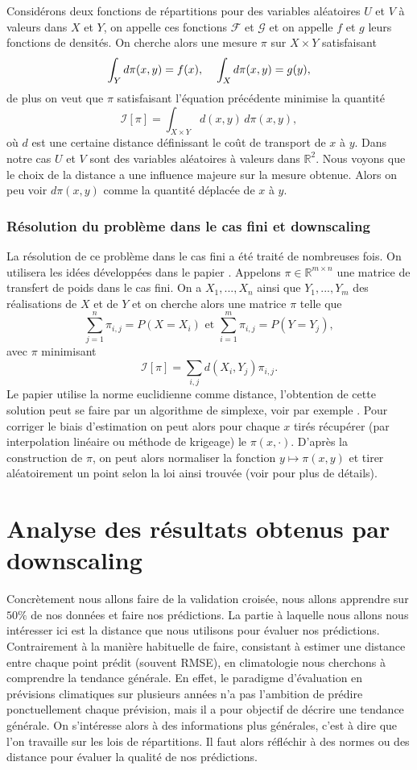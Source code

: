 \documentclass[a4paper,10pt]{article}
\begin{document}
Considérons deux fonctions de répartitions pour des variables aléatoires $U$ et $V$ à valeurs dans $X$ et $Y$, on appelle ces fonctions $\mathcal{F}$ et $\mathcal{G}$ et on appelle $f$ et $g$ leurs fonctions de densités. On cherche alors une mesure $\pi$ sur  $X \times Y$ satisfaisant
\[\int_{Y} d\pi(x,y)= f(x), \hspace{4mm} \int_{X}  d \pi(x,y)= g(y),\]
de plus on veut que $\pi$ satisfaisant l'équation précédente minimise la quantité
\[\mathcal{I}[\pi]=\int_{X \times Y}d(x,y) \, d\pi(x,y),\]
où $d$ est une certaine distance définissant le coût de transport de $x$ à $y$. Dans notre cas $U$ et $V$ sont des variables aléatoires à valeurs dans $\mathbb{R}^2$. Nous voyons que le choix de la distance a une influence majeure sur la mesure obtenue. Alors on peu voir $d\pi(x,y)$ comme la quantité déplacée de $x$ à $y$.
\subsubsection{Résolution du problème dans le cas fini et downscaling}
La résolution de ce problème dans le cas fini a été traité de nombreuses fois. On utilisera les idées développées dans le papier \cite{robin2019multivariate}. Appelons $\pi \in \mathbb{R}^{m\times n}$ une matrice de transfert de poids dans le cas fini. On a $X_1,...,X_n$ ainsi que $Y_1,...,Y_m$ des réalisations de $X$ et de $Y$ et on cherche alors une matrice $\pi$ telle que 
\[\sum_{j=1}^{n} \pi_{i,j}= P(X=X_i) \textrm{ et } \sum_{i=1}^{m} \pi_{i,j}= P(Y=Y_j),\]
avec $\pi$ minimisant 
\[\mathcal{I}[\pi]=\sum_{i,j}d(X_i,Y_j)\pi_{i,j}.\]  
Le papier utilise la norme euclidienne comme distance, l'obtention de cette solution peut se faire par un algorithme de simplexe, voir par exemple \cite{huang2012optimal}. Pour corriger le biais d'estimation on peut alors pour chaque $x$ tirés récupérer (par interpolation linéaire ou méthode de krigeage) le $\pi(x,\cdot)$. D'après la construction de $\pi$, on peut alors normaliser la fonction $y\mapsto \pi(x,y)$ et tirer aléatoirement un point selon la loi ainsi trouvée (voir \cite{robin2019multivariate} pour plus de détails).




\section{Analyse des résultats obtenus par downscaling}
\label{analyse-pred}
Concrètement nous allons faire de la validation croisée, nous allons apprendre sur $50\%$ de nos données et faire nos prédictions. La partie à laquelle nous allons nous intéresser ici est la distance que nous utilisons pour évaluer nos prédictions. Contrairement à la manière habituelle de faire, consistant à estimer une distance entre chaque point prédit (souvent RMSE), en climatologie nous cherchons à comprendre la tendance générale. En effet, le paradigme d'évaluation en prévisions climatiques sur plusieurs années n'a pas l'ambition de prédire ponctuellement chaque prévision, mais il a pour objectif de décrire une tendance générale. On s'intéresse alors à des informations plus générales, c'est à dire que l'on travaille sur les lois de répartitions. Il faut alors réfléchir à des normes ou des distance pour évaluer la qualité de nos prédictions.  
\end{document}
